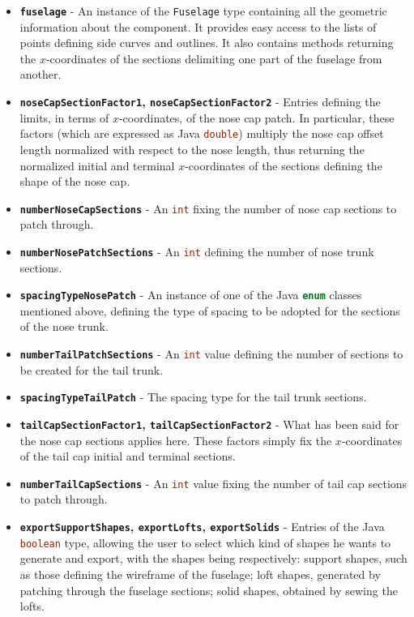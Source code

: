 \begin{itemize}
\renewcommand\labelitemi{\tiny$\blacksquare$}
\renewcommand\labelitemii{\tiny$\bullet$}
\item \textbf{\lstinline[language=Java]!fuselage!} - An instance of the \lstinline[language=Java]!Fuselage! type containing all the geometric information about the component. It provides easy access to the lists of points defining side curves and outlines. It also contains methods returning the $x$-coordinates of the sections delimiting one part of the fuselage from another.
\item \textbf{\lstinline[language=Java]!noseCapSectionFactor1!, \lstinline[language=Java]!noseCapSectionFactor2!} - Entries defining the limits, in terms of $x$-coordinates, of the nose cap patch. In particular, these factors (which are expressed as Java \lstinline[language=Java]!double!) multiply the nose cap offset length normalized with respect to the nose length, thus returning the normalized initial and terminal $x$-coordinates of the sections defining the shape of the nose cap. 
\item \textbf{\lstinline[language=Java]!numberNoseCapSections!} - An \lstinline[language=Java]!int! fixing the number of nose cap sections to patch through. 
\item \textbf{\lstinline[language=Java]!numberNosePatchSections!} - An \lstinline[language=Java]!int! defining the number of nose trunk sections.
\item \textbf{\lstinline[language=Java]!spacingTypeNosePatch!} - An instance of one of the Java \lstinline[language=Java]!enum! classes mentioned above, defining the type of spacing to be adopted for the sections of the nose trunk. 
\item \textbf{\lstinline[language=Java]!numberTailPatchSections!} - An \lstinline[language=Java]!int! value defining the number of sections to be created for the tail trunk.
\item \textbf{\lstinline[language=Java]!spacingTypeTailPatch!} - The spacing type for the tail trunk sections.
\item \textbf{\lstinline[language=Java]!tailCapSectionFactor1!, \lstinline[language=Java]!tailCapSectionFactor2!} - What has been said for the nose cap sections applies here. These factors simply fix the $x$-coordinates of the tail cap initial and terminal sections.
\item \textbf{\lstinline[language=Java]!numberTailCapSections!} - An \lstinline[language=Java]!int! value fixing the number of tail cap sections to patch through.
\item \textbf{\lstinline[language=Java]!exportSupportShapes!, \lstinline[language=Java]!exportLofts!, \lstinline[language=Java]!exportSolids!} - Entries of the Java \lstinline[language=Java]!boolean! type, allowing the user to select which kind of shapes he wants to generate and export, with the shapes being respectively: support shapes, such as those defining the wireframe of the fuselage; loft shapes, generated by patching through the fuselage sections; solid shapes, obtained by sewing the lofts.
\end{itemize}
